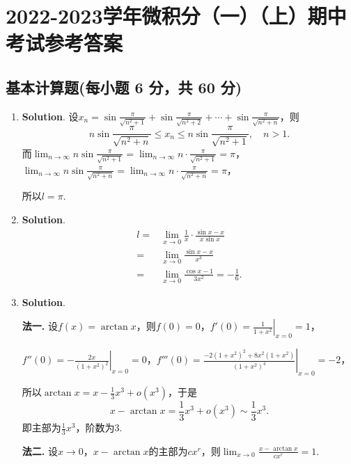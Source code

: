 \documentclass[../main.tex]{subfiles}
\begin{document}
\chapter{2022-2023学年微积分（一）（上）期中考试参考答案}
\section{基本计算题(每小题 6 分，共 60 分)}
\begin{enumerate}
    \item \textbf{Solution}. 设$x_{n}=\sin\frac{\pi}{\sqrt{n^{2}+1}}+\sin\frac{\pi}{\sqrt{n^{2}+2}}
              +\cdots+\sin\frac{\pi}{\sqrt{n^{2}+n}}$，则
          \[
              n\sin\frac{\pi}{\sqrt{n^{2}+n}}\leq x_{n} \leq n\sin\frac{\pi}{\sqrt{n^{2}+1}}
              ,\quad n>1.
          \]
          而$\lim_{n\to\infty}n\sin\frac{\pi}{\sqrt{n^{2}+1}}=\lim_{n\to\infty}n\cdot
              \frac{\pi}{\sqrt{n^{2}+1}}=\pi$，$\lim_{n\to\infty}n\sin\frac{\pi}{\sqrt{n^{2}+n}}
              =\lim_{n\to\infty}n\cdot\frac{\pi}{\sqrt{n^{2}+n}}=\pi$，

          所以$l=\pi$.

    \item \textbf{Solution}.
          \[
              \begin{aligned}
                  l= {} & \lim_{x\to 0}\frac{1}{x}\cdot\frac{\sin x-x}{x\sin x} \\
                  = {}  & \lim_{x\to0}\frac{\sin x-x}{x^3}                      \\
                  = {}  & \lim_{x\to0}\frac{\cos x-1}{3x^2}=-\frac{1}{6}.
              \end{aligned}
          \]

    \item \textbf{Solution}.

          \textbf{法一.} 设$f(x)=\arctan x$，则$f(0)=0$，$f'(0)=\left.\frac{1}{1+x^{2}}
              \right|_{x=0}=1$，

          $f''(0)=\left.-\frac{2x}{(1+x^{2})^{2}}\right|_{x=0}=0$，$f'''(0)=\left.\frac{-2(1+x^{2})^{2}+8x^{2}(1+x^{2})}{(1+x^{2})^{4}}
              \right|_{x=0}=-2$，

          所以$\arctan x=x-\frac{1}{3}x^{3}+o(x^{3})$，于是
          \[
              x-\arctan x=\frac{1}{3}x^{3}+o(x^{3})\sim\frac{1}{3}x^{3}.
          \]
          即主部为$\frac{1}{3}x^{3}$，阶数为$3$.

          \textbf{法二.} 设$x\to0$，$x-\arctan x$的主部为$cx^{r}$，则$\lim_{x\to0}\frac{x-\arctan
                  x}{cx^{r}}=1$.


\end{enumerate}
\end{document}
